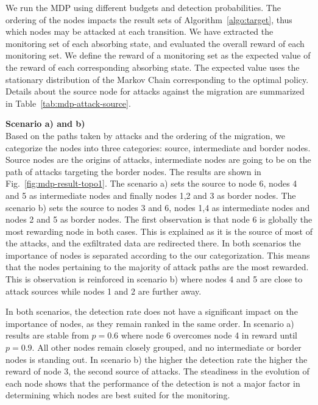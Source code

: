 We run the MDP using different budgets and detection probabilities.
The ordering of the nodes impacts the result sets of Algorithm~\ref{algo:target}, thus which nodes may be attacked at each transition.
We have extracted the monitoring set of each absorbing state, and evaluated the overall reward of each monitoring set.
We define the reward of a monitoring set as the expected value of the reward of each corresponding absorbing state.
The expected value uses the stationary distribution of the Markov Chain corresponding to the optimal policy.
Details about the source node for attacks against the migration are summarized in Table~\ref{tab:mdp-attack-source}.



\textbf{Scenario a) and b)\\}
Based on the paths taken by attacks and the ordering of the migration, we categorize the nodes into three categories: source, intermediate and border nodes. Source nodes are the origins of attacks, intermediate nodes are going to be on the path of attacks targeting the border nodes. 
The results are shown in Fig.~\ref{fig:mdp-result-topo1}.
The scenario a) sets the source to node 6, nodes 4 and 5 as intermediate nodes and finally nodes 1,2 and 3 as border nodes.
The scenario b) sets the source to nodes 3 and 6, nodes 1,4 as intermediate nodes and nodes 2 and 5 as border nodes.
The first observation is that node 6 is globally the most rewarding node in both cases.
This is explained as it is the source of most of the attacks, and the exfiltrated data are redirected there.
In both scenarios the importance of nodes is separated according to the our categorization. 
This means that the nodes pertaining to the majority of attack paths are the most rewarded.
This is observation is reinforced in scenario b) where nodes 4 and 5 are close to attack sources while nodes 1 and 2 are further away.

In both scenarios, the detection rate does not have a significant impact on the importance of nodes, as they remain ranked in the same order.
In scenario a) results are stable from $p=0.6$ where node 6 overcomes node 4 in reward until $p=0.9$. All other nodes remain closely grouped, and no intermediate or border nodes is standing out.
In scenario b) the higher the detection rate the higher the reward of node 3, the second source of attacks.
The steadiness in the evolution of each node shows that the performance of the detection is not a major factor in determining which nodes are best suited for the monitoring. 

